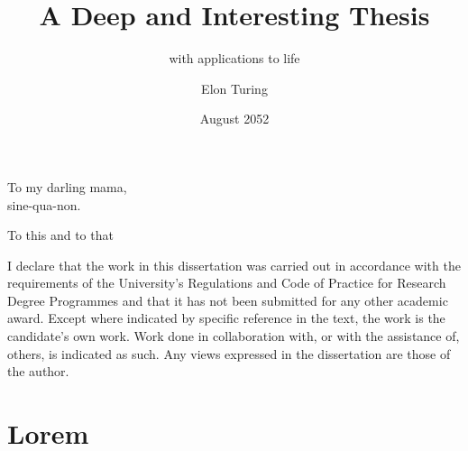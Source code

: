 \documentclass{uob-thesis}
\title{A Deep and Interesting Thesis}
\subtitle{with applications to life}
\author{Elon Turing}
\date{August 2052}
\begin{document}

\recalctypearea

\maketitle

\cleardoublepage

\begin{abstract}
  \lipsum[1-2]
\end{abstract}

\begin{dedication}
  To my darling mama,\\
  sine-qua-non.
\end{dedication}

\begin{acknowledgements}
  To this and to that
\end{acknowledgements}

\begin{declaration}
  I declare that the work in this dissertation was carried out in accordance
  with the requirements of the University's Regulations and Code of Practice for
  Research Degree Programmes and that it has not been submitted for any other
  academic award. Except where indicated by specific reference in the text, the
  work is the candidate's own work. Work done in collaboration with, or with the
  assistance of, others, is indicated as such. Any views expressed in the
  dissertation are those of the author.
\end{declaration}

\recalctypearea




\frontmatter

\tableofcontents
\listoftables
\listoffigures



\mainmatter

\part{Lorem}
\end{document}
